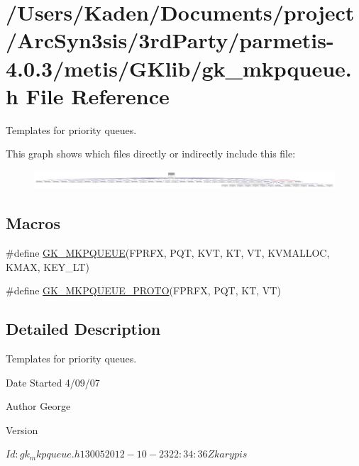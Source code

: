 \hypertarget{a00062}{}\section{/\+Users/\+Kaden/\+Documents/project/\+Arc\+Syn3sis/3rd\+Party/parmetis-\/4.0.3/metis/\+G\+Klib/gk\+\_\+mkpqueue.h File Reference}
\label{a00062}


Templates for priority queues.  


This graph shows which files directly or indirectly include this file\+:\nopagebreak
\begin{figure}[H]
\begin{center}
\leavevmode
\includegraphics[width=350pt]{a00064}
\end{center}
\end{figure}
\subsection*{Macros}
\begin{DoxyCompactItemize}
\item 
\#define \hyperlink{a00062_aadfc1ce96b98ef173b685225b5377f09}{G\+K\+\_\+\+M\+K\+P\+Q\+U\+E\+UE}(F\+P\+R\+FX,  P\+QT,  K\+VT,  KT,  VT,  K\+V\+M\+A\+L\+L\+OC,  K\+M\+AX,  K\+E\+Y\+\_\+\+LT)
\item 
\#define \hyperlink{a00062_a499069149580178be23cf3476e58549d}{G\+K\+\_\+\+M\+K\+P\+Q\+U\+E\+U\+E\+\_\+\+P\+R\+O\+TO}(F\+P\+R\+FX,  P\+QT,  KT,  VT)
\end{DoxyCompactItemize}


\subsection{Detailed Description}
Templates for priority queues. 

\begin{DoxyDate}{Date}
Started 4/09/07 
\end{DoxyDate}
\begin{DoxyAuthor}{Author}
George 
\end{DoxyAuthor}
\begin{DoxyVersion}{Version}
\begin{DoxyVerb}$Id: gk_mkpqueue.h 13005 2012-10-23 22:34:36Z karypis $ \end{DoxyVerb}
 
\end{DoxyVersion}


